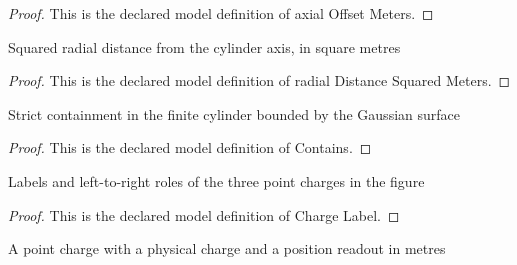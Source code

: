 \begin{proof}
  This is the declared model definition of axial Offset Meters.
\end{proof}
\begin{definition}
  \label{def:physics:phyx-mini-0848:phyxminiproblems-problemphyxmini0848-cylindricalgaussiansurface-radialdistancesquaredmeters}
  Squared radial distance from the cylinder axis, in square metres
\end{definition}
\begin{proof}
  This is the declared model definition of radial Distance Squared Meters.
\end{proof}
\begin{definition}[Contains]
  \label{def:physics:phyx-mini-0848:phyxminiproblems-problemphyxmini0848-cylindricalgaussiansurface-contains}
  Strict containment in the finite cylinder bounded by the Gaussian surface
\end{definition}
\begin{proof}
  This is the declared model definition of Contains.
\end{proof}
\begin{definition}
  \label{def:physics:phyx-mini-0848:phyxminiproblems-problemphyxmini0848-chargelabel}
  Labels and left-to-right roles of the three point charges in the figure
\end{definition}
\begin{proof}
  This is the declared model definition of Charge Label.
\end{proof}
\begin{definition}
  \label{def:physics:phyx-mini-0848:phyxminiproblems-problemphyxmini0848-pointcharge}
  A point charge with a physical charge and a position readout in metres
\end{definition}
